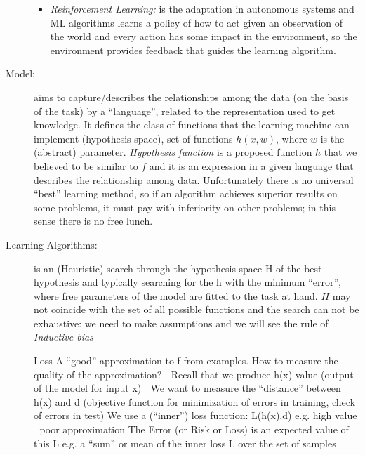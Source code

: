\begin{description}
\begin{itemize}
                        \item \emph{Reinforcement Learning: } is the adaptation in autonomous systems and 
                              ML algorithms learns a policy of how to act given an observation of the
                              world and every action has some impact in the environment, so the
                              environment provides feedback that guides the learning algorithm.
                   \end{itemize}
    \item [Model: ] aims to capture/describes the relationships among the data (on the basis of the task)
                    by a “language”, related to the representation used to get knowledge.\newline
                    It defines the class of functions that the learning machine can implement (hypothesis space),
                    set of functions $h(x, w)$, where $w$ is the (abstract) parameter.\newline
                    \emph{Hypothesis function} is a proposed function $h$ that we believed to be similar to $f$ 
                    and it is an expression in a given language that describes the relationship among data.\newline
                    Unfortunately there is no universal “best” learning method, so if an algorithm achieves
                    superior results on some problems, it must pay with inferiority on other problems;
                    in this sense there is no free lunch.

    \item [Learning Algorithms: ] is an (Heuristic) search through the hypothesis space H of the best hypothesis
                                  and typically searching for the h with the minimum “error”, where 
                                  free parameters of the model are fitted to the task at hand.\newline
                                  $H$ may not coincide with the set of all possible functions and the
                                  search can not be exhaustive: we need to make assumptions and we will
                                  see the rule of \emph{Inductive bias}


 Loss
A “good” approximation to f from examples.
How to measure the quality of the approximation?
 Recall that we produce h(x) value (output of the model for input x)
 We want to measure the “distance” between h(x) and d
(objective function for minimization of errors in training, check of errors in test)
We use a (“inner”) loss function:
 L(h(x),d)
e.g. high value  poor approximation
The Error (or Risk or Loss) is an expected value of this L
e.g. a “sum” or mean of the inner loss L over the set of samples


\end{description}

